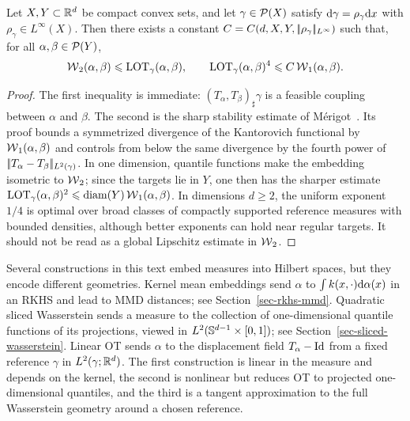 \begin{prop}\label{prop-linear-ot-stability}
	Let $X,Y\subset\mathbb{R}^d$ be compact convex sets, and let $\gamma\in\mathcal{P}(X)$ satisfy $\mathrm{d}\gamma=\rho_\gamma\mathrm{d} x$ with $\rho_\gamma\in L^\infty(X)$. Then there exists a constant $C=C(d,X,Y,|\!| \rho_\gamma |\!|_{L^\infty})$ such that, for all $\alpha,\beta\in\mathcal{P}(Y)$,
	\[
		\operatorname{\mathcal{W}}_2(\alpha,\beta)\leqslant \operatorname{LOT}_\gamma(\alpha,\beta),
		\qquad
		\operatorname{LOT}_\gamma(\alpha,\beta)^4
		\leqslant
		C\operatorname{\mathcal{W}}_1(\alpha,\beta).
	\]
\end{prop}
\begin{proof}
	The first inequality is immediate: $(T_\alpha,T_\beta)_\sharp\gamma$ is a feasible coupling between $\alpha$ and $\beta$. The second is the sharp stability estimate of M\'erigot~\cite{Merigot2026SharpBrenier,Merigot2026EmbeddingWasserstein}. Its proof bounds a symmetrized divergence of the Kantorovich functional by $\operatorname{\mathcal{W}}_1(\alpha,\beta)$ and controls from below the same divergence by the fourth power of $|\!| T_\alpha-T_\beta |\!|_{L^2(\gamma)}$.
	In one dimension, quantile functions make the embedding isometric to $\operatorname{\mathcal{W}}_2$; since the targets lie in $Y$, one then has the sharper estimate $\operatorname{LOT}_\gamma(\alpha,\beta)^2\leqslant\operatorname{diam}(Y)\operatorname{\mathcal{W}}_1(\alpha,\beta)$. In dimensions $d\geq2$, the uniform exponent $1/4$ is optimal over broad classes of compactly supported reference measures with bounded densities, although better exponents can hold near regular targets. It should not be read as a global Lipschitz estimate in $\operatorname{\mathcal{W}}_2$.
\end{proof}

\begin{rem}\label{rem-three-hilbertian-measure-embeddings}
	Several constructions in this text embed measures into Hilbert spaces, but they encode different geometries. Kernel mean embeddings send $\alpha$ to $\int k(x,\cdot)\mathrm{d}\alpha(x)$ in an RKHS and lead to MMD distances; see Section~\ref{sec-rkhs-mmd}. Quadratic sliced Wasserstein sends a measure to the collection of one-dimensional quantile functions of its projections, viewed in $L^2(\mathbb{S}^{d-1}\times[0,1])$; see Section~\ref{sec-sliced-wasserstein}. Linear OT sends $\alpha$ to the displacement field $T_\alpha-\mathrm{Id}$ from a fixed reference $\gamma$ in $L^2(\gamma;\mathbb{R}^d)$. The first construction is linear in the measure and depends on the kernel, the second is nonlinear but reduces OT to projected one-dimensional quantiles, and the third is a tangent approximation to the full Wasserstein geometry around a chosen reference.
\end{rem}

